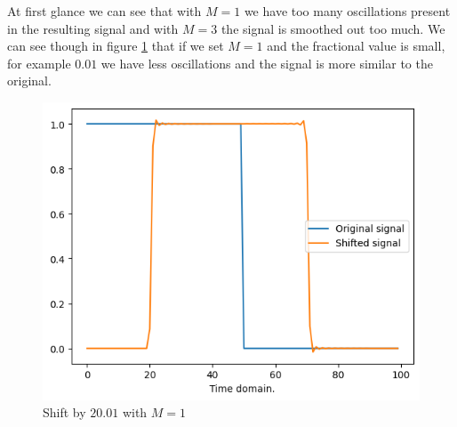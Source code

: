 \documentclass[]{usiinfbachelorproject}
\begin{document}
		At first glance we can see that with $M=1$ we have too many oscillations present in the resulting signal and with $M=3$ the signal is smoothed out too much. We can see though in figure \ref{small_shift_M_1} that if we set $M=1$ and the fractional value is small, for example $0.01$ we have less oscillations and the signal is more similar to the original.
		
		\begin{figure}[H]
			\centering
			\includegraphics[width=0.4\columnwidth]{images/Results/M_1_small_shift.png}
			\caption{Shift by $20.01$ with $M=1$}
			\label{small_shift_M_1}
		\end{figure}
		
\end{document}
